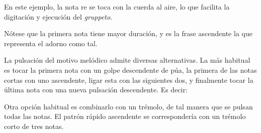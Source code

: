 \begin{center}
\end{center}


En este ejemplo, la nota re se toca con la cuerda al aire, lo que facilita la digitación y ejecución del \emph{gruppeto}.

Nótese que la primera nota tiene mayor duración, y es la frase ascendente la que representa el adorno como tal.

La pulsación del motivo melódico admite diversas alternativas. La más habitual es tocar la primera nota con un golpe descendente de púa, la primera de las notas cortas con uno ascendente, ligar esta con las siguientes dos, y finalmente tocar la última nota con una nueva pulsación descendente. Es decir:

\begin{center}
\end{center}


Otra opción habitual es combinarlo con un trémolo, de tal manera que se pulsan todas las notas. El patrón rápido ascendente se correspondería con un trémolo corto de tres notas.

